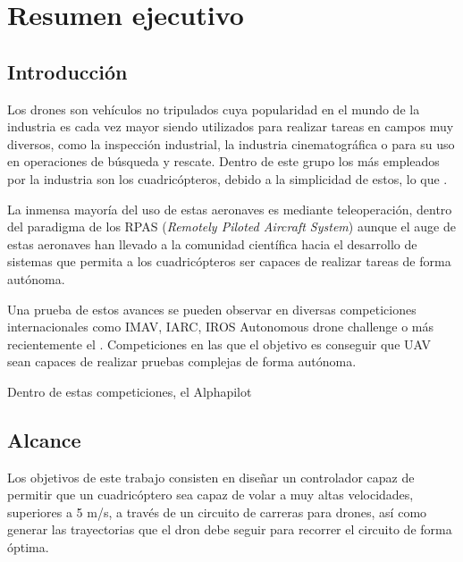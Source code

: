 \chapter*{Resumen ejecutivo}
\section*{Introducción}

Los drones son vehículos no tripulados cuya popularidad en el mundo de la industria es cada vez mayor siendo utilizados para realizar tareas en campos muy diversos, como la inspección industrial, la industria cinematográfica o para su uso en operaciones de búsqueda y rescate. Dentro de este grupo los más empleados por la industria son los cuadricópteros, debido a la simplicidad de estos, lo que .

La inmensa mayoría del uso de estas aeronaves es mediante teleoperación, dentro del paradigma de los RPAS (\textit{Remotely Piloted Aircraft System}) aunque el auge de estas aeronaves han llevado a la comunidad científica hacia el desarrollo de sistemas que permita a los cuadricópteros ser capaces de realizar tareas de forma autónoma.

Una prueba de estos avances se pueden observar en diversas competiciones internacionales como IMAV, IARC, IROS Autonomous drone challenge o más recientemente el . Competiciones en las que el objetivo es conseguir que UAV sean capaces de realizar pruebas complejas de forma autónoma.



Dentro de estas competiciones, el Alphapilot 






\section*{Alcance}

Los objetivos de este trabajo consisten en diseñar un controlador capaz de permitir que un cuadricóptero sea capaz de volar a muy altas velocidades, superiores a 5 m/s, a través de un circuito de carreras para drones, así como generar las trayectorias que el dron debe seguir para recorrer el circuito de forma óptima.

